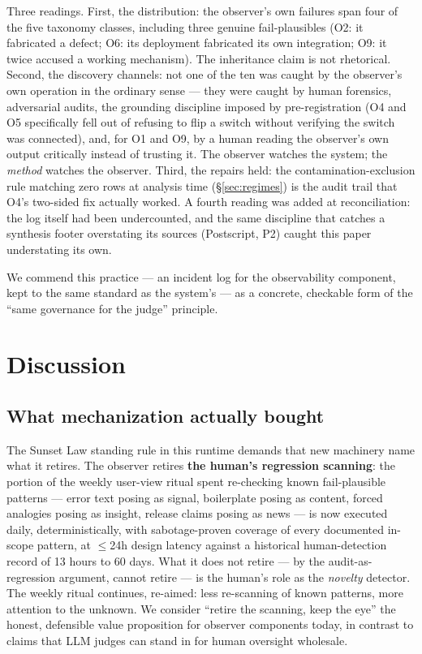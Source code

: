 \documentclass[11pt]{article}
\begin{document}
Three readings. First, the distribution: the observer's own failures
span four of the five taxonomy classes, including three genuine
fail-plausibles (O2: it fabricated a defect; O6: its deployment
fabricated its own integration; O9: it twice accused a working
mechanism). The inheritance claim is not rhetorical. Second, the
discovery channels: not one of the ten was caught by the observer's own
operation in the ordinary sense --- they were caught by human forensics,
adversarial audits, the grounding discipline imposed by
pre-registration (O4 and O5 specifically fell out of refusing to flip a
switch without verifying the switch was connected), and, for O1 and O9,
by a human reading the observer's own output critically instead of
trusting it. The observer watches the system; the \emph{method} watches
the observer. Third, the repairs held: the contamination-exclusion rule
matching zero rows at analysis time (\S\ref{sec:regimes}) is the audit
trail that O4's two-sided fix actually worked. A fourth reading was
added at reconciliation: the log itself had been undercounted, and the
same discipline that catches a synthesis footer overstating its sources
(Postscript, P2) caught this paper understating its own.

We commend this practice --- an incident log for the observability
component, kept to the same standard as the system's --- as a concrete,
checkable form of the ``same governance for the judge'' principle.

\section{Discussion}
\label{sec:discussion}

\subsection{What mechanization actually bought}

The Sunset Law standing rule in this runtime demands that new machinery
name what it retires. The observer retires \textbf{the human's
regression scanning}: the portion of the weekly user-view ritual spent
re-checking known fail-plausible patterns --- error text posing as
signal, boilerplate posing as content, forced analogies posing as
insight, release claims posing as news --- is now executed daily,
deterministically, with sabotage-proven coverage of every documented
in-scope pattern, at $\leq$24h design latency against a historical
human-detection record of 13 hours to 60 days. What it does not
retire --- by the audit-as-regression argument, cannot retire --- is
the human's role as the \emph{novelty} detector. The weekly ritual
continues, re-aimed: less re-scanning of known patterns, more attention
to the unknown. We consider ``retire the scanning, keep the eye'' the
honest, defensible value proposition for observer components today, in
contrast to claims that LLM judges can stand in for human oversight
wholesale.
\end{document}
